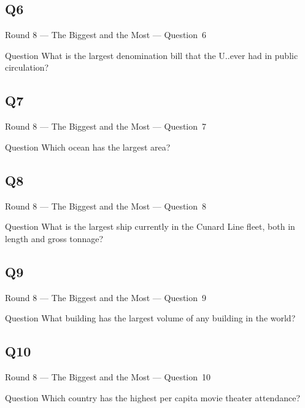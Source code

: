 \documentclass[11pt]{beamer}
\begin{document}
\subsection*{Q6}
\begin{frame}[t]{Round 8 --- The Biggest and the Most --- \mbox{Question 6}}
\vspace{-0.5em}
\begin{block}{Question}
What is the largest denomination bill that the U.\@S.\@ ever had in public circulation?
\end{block}
\end{frame}
\subsection*{Q7}
\begin{frame}[t]{Round 8 --- The Biggest and the Most --- \mbox{Question 7}}
\vspace{-0.5em}
\begin{block}{Question}
Which ocean has the largest area?
\end{block}
\end{frame}
\subsection*{Q8}
\begin{frame}[t]{Round 8 --- The Biggest and the Most --- \mbox{Question 8}}
\vspace{-0.5em}
\begin{block}{Question}
What is the largest ship currently in the Cunard Line fleet, both in length and gross tonnage?
\end{block}
\end{frame}
\subsection*{Q9}
\begin{frame}[t]{Round 8 --- The Biggest and the Most --- \mbox{Question 9}}
\vspace{-0.5em}
\begin{block}{Question}
What building has the largest volume of any building in the world?
\end{block}
\end{frame}
\subsection*{Q10}
\begin{frame}[t]{Round 8 --- The Biggest and the Most --- \mbox{Question 10}}
\vspace{-0.5em}
\begin{block}{Question}
Which country has the highest per capita movie  theater attendance?
\end{block}
\end{frame}
\end{document}
